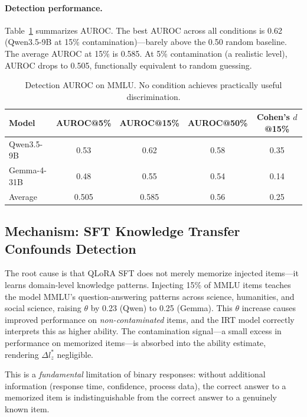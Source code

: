 \documentclass[11pt]{article}
\begin{document}
\paragraph{Detection performance.}
Table~\ref{tab:auroc} summarizes AUROC.
The best AUROC across all conditions is 0.62 (Qwen3.5-9B at 15\% contamination)---barely above the 0.50 random baseline.
The average AUROC at 15\% is 0.585.
At 5\% contamination (a realistic level), AUROC drops to 0.505, functionally equivalent to random guessing.

\begin{table}[t]
\centering
\caption{Detection AUROC on MMLU. No condition achieves practically useful discrimination.}
\label{tab:auroc}
\begin{tabular}{lcccc}
\toprule
Model & AUROC@5\% & AUROC@15\% & AUROC@50\% & Cohen's $d$@15\% \\
\midrule
Qwen3.5-9B  & 0.53  & 0.62  & 0.58  & 0.35 \\
Gemma-4-31B & 0.48  & 0.55  & 0.54  & 0.14 \\
\midrule
Average     & 0.505 & 0.585 & 0.56  & 0.25 \\
\bottomrule
\end{tabular}
\end{table}

\subsection{Mechanism: SFT Knowledge Transfer Confounds Detection}

The root cause is that QLoRA SFT does not merely memorize injected items---it learns domain-level knowledge patterns.
Injecting 15\% of MMLU items teaches the model MMLU's question-answering patterns across science, humanities, and social science, raising $\theta$ by 0.23 (Qwen) to 0.25 (Gemma).
This $\theta$ increase causes improved performance on \emph{non-contaminated} items, and the IRT model correctly interprets this as higher ability.
The contamination signal---a small excess in performance on memorized items---is absorbed into the ability estimate, rendering $\Delta l_z^*$ negligible.

This is a \emph{fundamental} limitation of binary responses: without additional information (response time, confidence, process data), the correct answer to a memorized item is indistinguishable from the correct answer to a genuinely known item.

\end{document}
